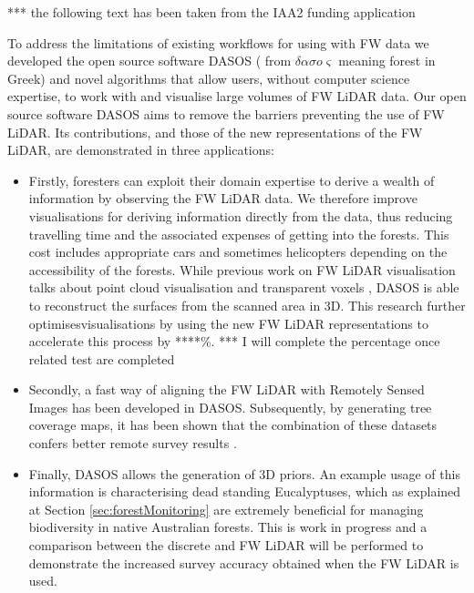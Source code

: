 \documentclass{subfiles}
\begin{document}
\par {\color{red} *** the following text has been taken from the IAA2 funding application}
	
\par To address the limitations of existing workflows for using with FW data we developed the open source software DASOS ( from $\delta \alpha \sigma o \varsigma$ meaning forest in Greek) and novel algorithms that allow users, without computer science expertise, to work with and visualise large volumes of FW LiDAR data. Our open source software DASOS aims to remove the barriers preventing the use of FW LiDAR. Its contributions, and those of the new representations of the FW LiDAR, are demonstrated in three applications:

\begin{itemize}
\item Firstly, foresters can exploit their domain expertise to derive a wealth of information by observing the FW LiDAR data. We therefore improve visualisations for deriving information directly from the data, thus reducing travelling time and the associated expenses of getting into the forests. This cost includes appropriate cars and sometimes helicopters depending on the accessibility of the forests. While previous work on FW LiDAR visualisation talks about point cloud visualisation \cite{Isenburg2012Pulsewaves} and transparent voxels \cite{Persson2005}, DASOS is able to reconstruct the surfaces from the scanned area in 3D. This research further optimisesvisualisations by using the new FW LiDAR representations to accelerate this process by ****\%. {\color{red} *** I will complete the percentage once related test are completed}

\item Secondly, a fast way of aligning the FW LiDAR with Remotely Sensed Images has been developed in DASOS. Subsequently, by generating tree coverage maps, it has been shown that the combination of these datasets confers better remote survey results \cite{Miltiadou2015}.


\item {\color{gray} Finally, DASOS allows the generation of 3D priors. An example usage of this information is characterising dead standing Eucalyptuses, which as explained at Section \ref{sec:forestMonitoring} are extremely beneficial for managing biodiversity in native Australian forests. This is work in progress and a comparison between the discrete and FW LiDAR will be performed to demonstrate the increased survey accuracy obtained when the FW LiDAR is used.}

\end{itemize}
\end{document}
